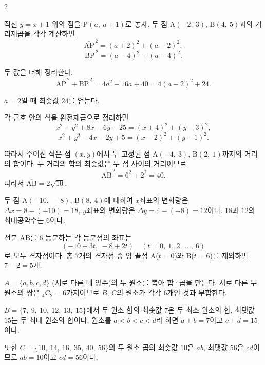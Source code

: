 \documentclass[10pt,fleqn]{article}
\begin{document}
\begin{multicols}{2}
\raggedcolumns


직선 $y = x + 1$ 위의 점을 $\mathrm{P}(a,\ a + 1)$로 놓자. 두 점 $\mathrm{A}(-2,\ 3)$, $\mathrm{B}(4,\ 5)$과의 거리제곱을 각각 계산하면
\[ \overline{\mathrm{AP}}^{\,2} = (a+2)^{2} + (a-2)^{2}, \]
\[ \overline{\mathrm{BP}}^{\,2} = (a-4)^{2} + (a-4)^{2}. \]

두 값을 더해 정리한다.
\[ \overline{\mathrm{AP}}^{\,2} + \overline{\mathrm{BP}}^{\,2} = 4a^{2} - 16a + 40 = 4(a - 2)^{2} + 24. \]

$a = 2$일 때 최솟값 $24$를 얻는다.


각 근호 안의 식을 완전제곱으로 정리하면
\[ x^{2} + y^{2} + 8x - 6y + 25 = (x+4)^{2} + (y-3)^{2}, \]
\[ x^{2} + y^{2} - 4x - 2y + 5 = (x-2)^{2} + (y-1)^{2}. \]

따라서 주어진 식은 점 $(x, y)$에서 두 고정된 점 $\mathrm{A}(-4,\ 3)$, $\mathrm{B}(2,\ 1)$까지의 거리의 합이다. 두 거리의 합의 최솟값은 두 점 사이의 거리이므로
\[ \overline{\mathrm{AB}}^{\,2} = 6^{2} + 2^{2} = 40. \]
따라서 $\overline{\mathrm{AB}} = 2\sqrt{10}$.


두 점 $\mathrm{A}(-10,\ -8)$, $\mathrm{B}(8,\ 4)$에 대하여 $x$좌표의 변화량은 $\Delta x = 8 - (-10) = 18$, $y$좌표의 변화량은 $\Delta y = 4 - (-8) = 12$이다. $18$과 $12$의 최대공약수는 $6$이다.

선분 $\mathrm{AB}$를 $6$ 등분하는 각 등분점의 좌표는
\[ \left(-10 + 3t,\ -8 + 2t\right)\quad (t = 0,\ 1,\ 2,\ \dots,\ 6) \]
로 모두 격자점이다. 총 $7$개의 격자점 중 양 끝점 $\mathrm{A}$($t = 0$)와 $\mathrm{B}$($t = 6$)를 제외하면 $7 - 2 = 5$개.


$A = \{a, b, c, d\}$ (서로 다른 네 양수)의 두 원소를 뽑아 합·곱을 만든다. 서로 다른 두 원소의 쌍은 ${}_{4}\mathrm{C}_{2} = 6$가지이므로 $B$, $C$의 원소가 각각 $6$개인 것과 부합한다.

$B = \{7,\ 9,\ 10,\ 12,\ 13,\ 15\}$에서 두 원소 합의 최솟값 $7$은 두 최소 원소의 합, 최댓값 $15$는 두 최대 원소의 합이다. 원소를 $a < b < c < d$라 하면 $a + b = 7$이고 $c + d = 15$이다.

또한 $C = \{10,\ 14,\ 16,\ 35,\ 40,\ 56\}$의 두 원소 곱의 최솟값 $10$은 $ab$, 최댓값 $56$은 $cd$이므로 $ab = 10$이고 $cd = 56$이다.


\end{multicols}
\end{document}
